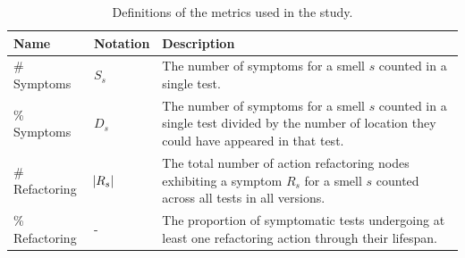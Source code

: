 \begin{table}
\centering

\caption{Definitions of the metrics used in the study.}
\label{tab:metrics}

\begin{tabular}{>{\raggedright}p{1in}>{\raggedright}p{0.5in}>{\raggedright}p{2.9in}}

\toprule
\scriptsize{\textbf{Name}} & \scriptsize{\textbf{Notation}} & \scriptsize{\textbf{Description}} \tabularnewline
\toprule

\scriptsize{\# Symptoms} & \scriptsize{$S_s$} & \scriptsize{The number of symptoms for a smell $s$ counted in a single test.} \tabularnewline
\scriptsize{\% Symptoms} & \scriptsize{$D_s$} & \scriptsize{The number of symptoms for a smell $s$ counted in a single test divided by the number of location they could have appeared in that test.} \tabularnewline
\scriptsize{\# Refactoring} & \scriptsize{$\abs{R_{s}}$} & \scriptsize{The total number of action refactoring nodes exhibiting a symptom $R_{s}$ for a smell $s$ counted across all tests in all versions.} \tabularnewline
\scriptsize{\% Refactoring} & \scriptsize{-} & \scriptsize{The proportion of symptomatic tests undergoing at least one refactoring action through their lifespan.} \tabularnewline
\bottomrule

\end{tabular}

\end{table}